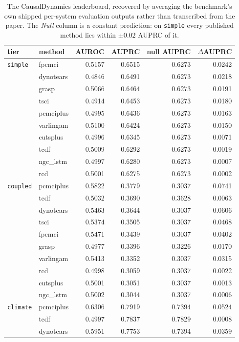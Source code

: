 \begin{table}[t]\centering\small
\caption{The CausalDynamics leaderboard, recovered by averaging the benchmark's own shipped per-system evaluation outputs rather than transcribed from the paper. The \emph{Null} column is a constant prediction: on \texttt{simple} every published method lies within $\pm0.02$ AUPRC of it.}
\label{tab:bench-dynamics-published}
\begin{tabular}{llrrrr}\toprule
tier & method & AUROC & AUPRC & null AUPRC & $\Delta$AUPRC\\\midrule
\texttt{simple} & fpcmci & 0.5157 & 0.6515 & 0.6273 & 0.0242\\
 & dynotears & 0.4846 & 0.6491 & 0.6273 & 0.0218\\
 & grasp & 0.5066 & 0.6464 & 0.6273 & 0.0191\\
 & tsci & 0.4914 & 0.6453 & 0.6273 & 0.0180\\
 & pcmciplus & 0.4995 & 0.6436 & 0.6273 & 0.0163\\
 & varlingam & 0.5100 & 0.6424 & 0.6273 & 0.0150\\
 & cutsplus & 0.4996 & 0.6345 & 0.6273 & 0.0071\\
 & tcdf & 0.5009 & 0.6292 & 0.6273 & 0.0019\\
 & ngc\_lstm & 0.4997 & 0.6280 & 0.6273 & 0.0007\\
 & rcd & 0.5001 & 0.6275 & 0.6273 & 0.0002\\
\midrule
\texttt{coupled} & pcmciplus & 0.5822 & 0.3779 & 0.3037 & 0.0741\\
 & tcdf & 0.5032 & 0.3690 & 0.3628 & 0.0063\\
 & dynotears & 0.5463 & 0.3644 & 0.3037 & 0.0606\\
 & tsci & 0.5374 & 0.3505 & 0.3037 & 0.0468\\
 & fpcmci & 0.5471 & 0.3439 & 0.3037 & 0.0402\\
 & grasp & 0.4977 & 0.3396 & 0.3226 & 0.0170\\
 & varlingam & 0.5413 & 0.3352 & 0.3037 & 0.0315\\
 & rcd & 0.4998 & 0.3059 & 0.3037 & 0.0022\\
 & cutsplus & 0.5001 & 0.3051 & 0.3037 & 0.0013\\
 & ngc\_lstm & 0.5002 & 0.3044 & 0.3037 & 0.0006\\
\midrule
\texttt{climate} & pcmciplus & 0.6306 & 0.7919 & 0.7394 & 0.0524\\
 & tcdf & 0.4997 & 0.7837 & 0.7829 & 0.0008\\
 & dynotears & 0.5951 & 0.7753 & 0.7394 & 0.0359\\

\end{tabular}
\end{table}

